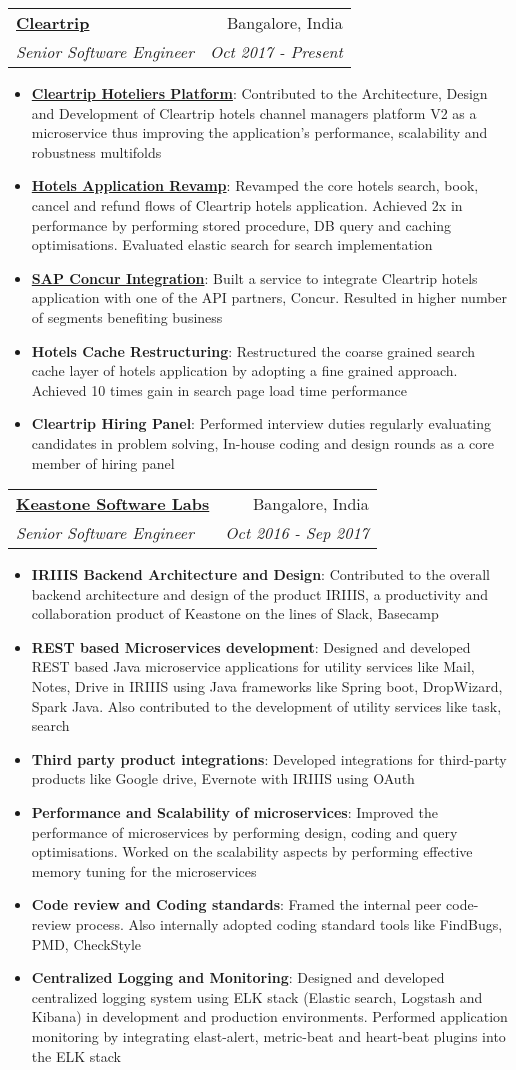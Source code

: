 \documentclass[letterpaper,11pt]{article}
\makeatletter
\newcommand{\resumeItem}[2]{
  \item\small{
    \textbf{#1}{: #2 \vspace{-2pt}}
  }
}
\newcommand{\resumeSubheading}[4]{
  \vspace{-1pt}\item
    \begin{tabular*}{0.97\textwidth}{l@{\extracolsep{\fill}}r}
      \textbf{#1} & #2 \\
      \textit{\small#3} & \textit{\small #4} \\
    \end{tabular*}\vspace{-5pt}
}
\newcommand{\resumeItemListStart}{\begin{itemize}}
\newcommand{\resumeItemListEnd}{\end{itemize}\vspace{-5pt}}
\makeatother
\begin{document}
    \resumeSubheading
      {\href{www.cleartrip.com}{Cleartrip}}{Bangalore, India}
      {Senior Software Engineer}{Oct 2017 - Present}
      \resumeItemListStart
          \resumeItem{\href{https://suite.cleartrip.com/login}{Cleartrip Hoteliers Platform}}
          {Contributed to the Architecture, Design and Development of Cleartrip hotels channel managers platform V2 as a microservice thus improving the application's performance, scalability and robustness multifolds}
          \resumeItem{\href{https://www.cleartrip.com/hotels}{Hotels Application Revamp}}
          {Revamped the core hotels search, book, cancel and refund flows of Cleartrip hotels application. Achieved 2x in performance by performing stored procedure, DB query and caching optimisations. Evaluated elastic search for search implementation}
          \resumeItem{\href{https://www.concur.co.in/travel-management}{SAP Concur Integration}}
          {Built a service to integrate Cleartrip hotels application with one of the API partners, Concur. Resulted in higher number of segments benefiting business}
          \resumeItem{Hotels Cache Restructuring}
          {Restructured the coarse grained search cache layer of hotels application by adopting a fine grained approach. Achieved 10 times gain in search page load time performance}
          \resumeItem{Cleartrip Hiring Panel}
          {Performed interview duties regularly evaluating candidates in problem solving, In-house coding and design rounds as a core member of hiring panel}
      \resumeItemListEnd
      
    \resumeSubheading
      {\href{http://www.keastone.com/}{Keastone Software Labs}}{Bangalore, India}
      {Senior Software Engineer}{Oct 2016 - Sep 2017}
      \resumeItemListStart
          \resumeItem{IRIIIS Backend Architecture and Design}
          {Contributed to the overall backend architecture and design of the product IRIIIS, a productivity and collaboration product of Keastone on the lines of Slack, Basecamp }
          \resumeItem{REST based Microservices development}
          {Designed and developed REST based Java microservice applications for utility services like Mail, Notes, Drive in IRIIIS using Java frameworks like Spring boot, DropWizard, Spark Java. Also contributed to the development of utility services like task, search }
          \resumeItem{Third party product integrations}
          {Developed integrations for third-party products like Google drive, Evernote with IRIIIS using OAuth}
          \resumeItem{Performance and Scalability of microservices}
          {Improved the performance of microservices by performing design, coding and query optimisations. Worked on the scalability aspects by performing effective memory tuning for the microservices}
          \resumeItem{Code review and Coding standards}
          {Framed the internal peer code-review process. Also internally adopted coding standard tools like FindBugs, PMD, CheckStyle}
           \resumeItem{Centralized Logging and Monitoring}
          {Designed and developed centralized logging system using ELK stack (Elastic search, Logstash and Kibana) in development and production environments. Performed application monitoring by integrating elast-alert, metric-beat and heart-beat plugins into the ELK stack}
      \resumeItemListEnd
\end{document}
